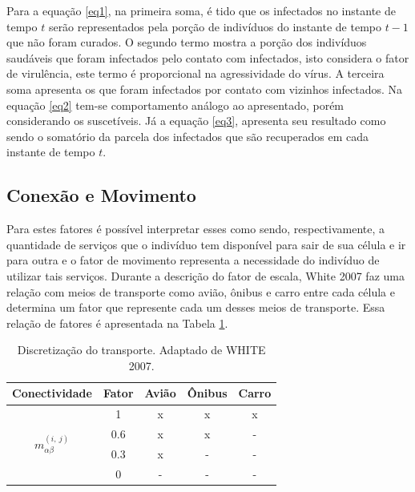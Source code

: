 \documentclass[a4paper,12pt]{article}
\begin{document}
Para a equação \ref{eq1}, na primeira soma, é tido que os infectados no instante de tempo $t$ serão representados pela porção de indivíduos do instante de tempo $t-1$ que não foram curados. O segundo termo mostra a porção dos indivíduos saudáveis que foram infectados pelo contato com infectados, isto considera o fator de virulência, este termo é proporcional na agressividade do vírus. A terceira soma apresenta os que foram infectados por contato com vizinhos infectados. Na equação \ref{eq2} tem-se comportamento análogo ao apresentado, porém considerando os suscetíveis. Já a equação \ref{eq3}, apresenta seu resultado como sendo o somatório da parcela dos infectados que são recuperados em cada instante de tempo $t$.

\subsection{Conexão e Movimento}
Para estes fatores é possível interpretar esses como sendo, respectivamente, a quantidade de serviços que o indivíduo tem disponível para sair de sua célula e ir para outra e o fator de movimento representa a necessidade do indivíduo de utilizar tais serviços. Durante a descrição do fator de escala, White 2007\cite{White2007} faz uma relação com meios de transporte como avião, ônibus e carro entre cada célula e determina um fator que represente cada um desses meios de transporte. Essa relação de fatores é apresentada na Tabela \ref{tab:movimentacao}. 

\begin{table}[ht]
 \caption{Discretização do transporte. Adaptado de WHITE 2007\cite{White2007}.}
 \centering
 \begin{tabular}{c|c|c|c|c}
  Conectividade & Fator & Avião & Ônibus & Carro \\
  \hline
  \multirow{4}{*}{$m_{\alpha \beta}^{\left(i,\:j\right)}$} & 1 & x & x & x \\
   & 0.6 & x & x & - \\
   & 0.3 & x & - & - \\
   & 0 & - & - & - \\
\end{tabular}
\label{tab:movimentacao}
\end{table}

\end{document}
